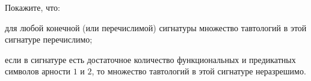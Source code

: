 Покажите, что:
\begin{enumcyr}
    \item для любой конечной (или перечислимой) сигнатуры множество тавтологий в этой сигнатуре перечислимо;
    \item если в сигнатуре есть достаточное количество функциональных и предикатных символов арности $1$ и $2$, то множество
	    тавтологий в этой сигнатуре неразрешимо.
\end{enumcyr}